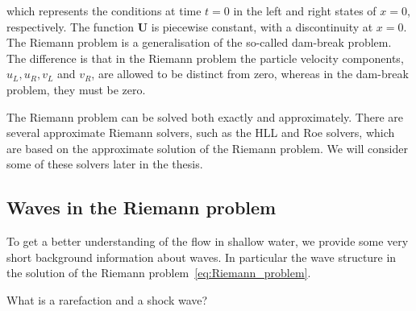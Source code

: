 which represents the conditions at time $t = 0$ in the left and right states of $x=0$, respectively.
The function $\mathbf{U}$ is piecewise constant, with a discontinuity at $x=0$.
The Riemann problem is a generalisation of the so-called dam-break problem.
The difference is that in the Riemann problem the particle velocity components, $u_L, u_R, v_L$ and $v_R$, are allowed to be distinct from zero, whereas in the dam-break problem, they must be zero.

The Riemann problem can be solved both exactly and approximately.
There are several approximate Riemann solvers, such as the HLL and Roe solvers, which are based on the approximate solution of the Riemann problem.
We will consider some of these solvers later in the thesis.

\subsection{Waves in the Riemann problem}
To get a better understanding of the flow in shallow water, we provide some very short background information about waves.
In particular the wave structure in the solution of the Riemann problem~\eqref{eq:Riemann_problem}.

What is a rarefaction and a shock wave?

